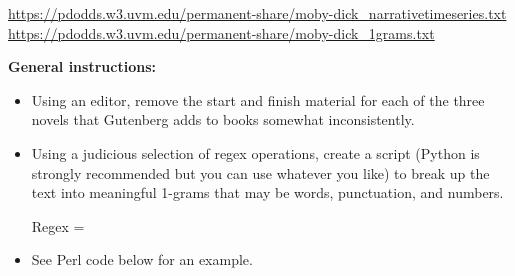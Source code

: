 \url{https://pdodds.w3.uvm.edu/permanent-share/moby-dick_narrativetimeseries.txt}\\
\url{https://pdodds.w3.uvm.edu/permanent-share/moby-dick_1grams.txt}

\textbf{General instructions:}

\begin{itemize}
\item
  Using an editor, remove the start and finish material
  for each of the three novels that Gutenberg adds to books
  somewhat inconsistently.
\item
  Using a judicious selection of regex operations,
  create a script (Python is strongly recommended but you can use whatever you like)
  to break up the text into meaningful 1-grams that
  may be words, punctuation, and numbers.

  Regex = 
\item
  See Perl code below for an example.
\end{itemize}


